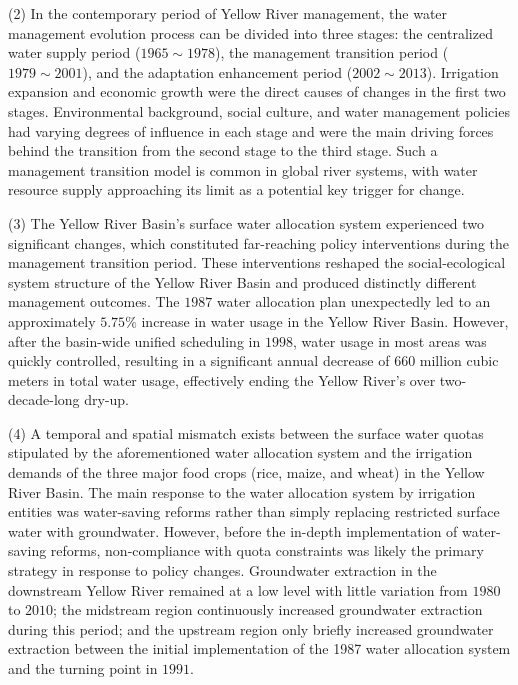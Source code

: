 \begin{eabstract}
  (2) In the contemporary period of Yellow River management, the water management evolution process can be divided into three stages: the centralized water supply period ($1965 \sim 1978$), the management transition period ($1979 \sim 2001$), and the adaptation enhancement period ($2002 \sim 2013$). Irrigation expansion and economic growth were the direct causes of changes in the first two stages. Environmental background, social culture, and water management policies had varying degrees of influence in each stage and were the main driving forces behind the transition from the second stage to the third stage. Such a management transition model is common in global river systems, with water resource supply approaching its limit as a potential key trigger for change.
  
  (3) The Yellow River Basin's surface water allocation system experienced two significant changes, which constituted far-reaching policy interventions during the management transition period. These interventions reshaped the social-ecological system structure of the Yellow River Basin and produced distinctly different management outcomes. The $1987$ water allocation plan unexpectedly led to an approximately $5.75\%$ increase in water usage in the Yellow River Basin. However, after the basin-wide unified scheduling in $1998$, water usage in most areas was quickly controlled, resulting in a significant annual decrease of $660$ million cubic meters in total water usage, effectively ending the Yellow River's over two-decade-long dry-up.
  
  (4) A temporal and spatial mismatch exists between the surface water quotas stipulated by the aforementioned water allocation system and the irrigation demands of the three major food crops (rice, maize, and wheat) in the Yellow River Basin. The main response to the water allocation system by irrigation entities was water-saving reforms rather than simply replacing restricted surface water with groundwater. However, before the in-depth implementation of water-saving reforms, non-compliance with quota constraints was likely the primary strategy in response to policy changes. Groundwater extraction in the downstream Yellow River remained at a low level with little variation from $1980$ to $2010$; the midstream region continuously increased groundwater extraction during this period; and the upstream region only briefly increased groundwater extraction between the initial implementation of the 1987 water allocation system and the turning point in $1991$.


\end{eabstract}
